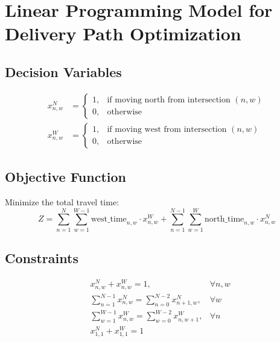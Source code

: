 \documentclass{article}
\begin{document}
\section*{Linear Programming Model for Delivery Path Optimization}

\subsection*{Decision Variables}

\begin{align*}
x_{n,w}^{N} &= 
\begin{cases} 
1, & \text{if moving north from intersection $(n, w)$} \\
0, & \text{otherwise}
\end{cases} \\
x_{n,w}^{W} &= 
\begin{cases} 
1, & \text{if moving west from intersection $(n, w)$} \\
0, & \text{otherwise}
\end{cases}
\end{align*}

\subsection*{Objective Function}

Minimize the total travel time:
\[
Z = \sum_{n=1}^{N} \sum_{w=1}^{W-1} \text{west\_time}_{n,w} \cdot x_{n,w}^{W} + \sum_{n=1}^{N-1} \sum_{w=1}^{W} \text{north\_time}_{n,w} \cdot x_{n,w}^{N}
\]

\subsection*{Constraints}

\begin{align*}
&x_{n,w}^{N} + x_{n,w}^{W} = 1, &\forall n, w \\
&\sum_{n=1}^{N-1} x_{n,w}^{N} = \sum_{n=0}^{N-2} x_{n+1,w}^{N}, &\forall w \\
&\sum_{w=1}^{W-1} x_{n,w}^{W} = \sum_{w=0}^{W-2} x_{n,w+1}^{W}, &\forall n \\
&x_{1,1}^{N} + x_{1,1}^{W} = 1
\end{align*}
\end{document}
